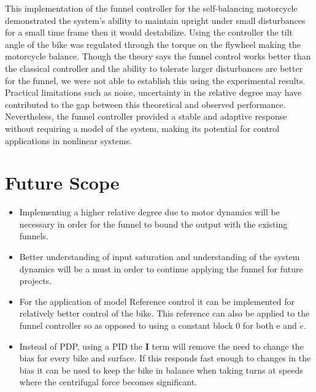 \documentclass{article}
\begin{document}
This implementation of the funnel controller for the self-balancing motorcycle demonstrated the system’s ability to maintain upright under small disturbances for a small time frame then it would destabilize. Using the controller the tilt angle of the bike was regulated through the torque on the flywheel making the motorcycle balance. Though the theory says the funnel control works better than the classical controller and the ability to tolerate larger disturbances are better for the funnel, we were not able to establish this using the experimental results. Practical limitations such as noise, uncertainty in the relative degree may have contributed to the gap between this theoretical and observed performance.
Nevertheless, the funnel controller provided a stable and adaptive response without requiring a model of the system, making its potential for control applications in nonlinear systems.\\





\section{Future Scope} \label{Future Scope}
\begin{itemize}
     

\item Implementing a higher relative degree due to motor dynamics will be necessary in order for the funnel to bound the output with the existing funnels. \\

\item Better understanding of input saturation and understanding of the system dynamics will be a must in order to continue applying the funnel for future projects.\\

\item For the application of model Reference control it can be implemented for relatively better control of the bike. This reference can also be applied to the funnel controller so as opposed to using a constant block 0 for both e and $\dot{e}$.\\

\item Instead of PDP, using a PID the \textbf{I} term will remove the need to change the bias for every bike and surface. If this responds fast enough to changes in the bias it can be used to keep the bike in balance when taking turns at speeds where the centrifugal force becomes significant.

\end{itemize}
\end{document}
